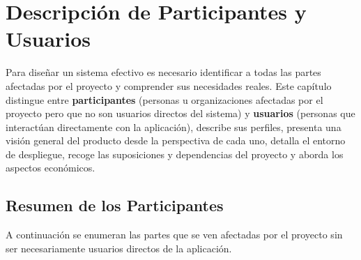 \section{Descripción de Participantes y Usuarios}
Para diseñar un sistema efectivo es necesario identificar a todas las partes
afectadas por el proyecto y comprender sus necesidades reales. Este capítulo
distingue entre \textbf{participantes} (personas u organizaciones afectadas por el
proyecto pero que no son usuarios directos del sistema) y \textbf{usuarios} (personas
que interactúan directamente con la aplicación), describe sus perfiles, presenta
una visión general del producto desde la perspectiva de cada uno, detalla el
entorno de despliegue, recoge las suposiciones y dependencias del proyecto y
aborda los aspectos económicos.

\subsection{Resumen de los Participantes}
A continuación se enumeran las partes que se ven afectadas por el proyecto sin
ser necesariamente usuarios directos de la aplicación.

\vspace{5mm}


